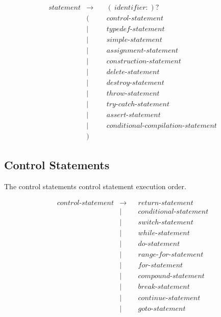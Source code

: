 \documentclass[a4paper,oneside,11pt]{article}
\begin{document}
\begin{align*}
statement &\rightarrow \> & &( \> \hyperref[identifier]{identifier} \texttt{:} \> )?\\
&( & &\hyperref[controlstatement]{control\textrm{-}statement}\\
&| & &\hyperref[typedefstatement]{typedef\textrm{-}statement}\\
&| & &\hyperref[simplestatement]{simple\textrm{-}statement}\\
&| & &\hyperref[assignmentstatement]{assignment\textrm{-}statement}\\
&| & &\hyperref[constructionstatement]{construction\textrm{-}statement}\\
&| & &\hyperref[deletestatement]{delete\textrm{-}statement}\\
&| & &\hyperref[destroystatement]{destroy\textrm{-}statement}\\
&| & &\hyperref[throwstatement]{throw\textrm{-}statement}\\
&| & &\hyperref[trystatement]{try\textrm{-}catch\textrm{-}statement}\\
&| & &\hyperref[assertstatement]{assert\textrm{-}statement}\\
&| & &\hyperref[conditionalcompilationstatement]{conditional\textrm{-}compilation\textrm{-}statement}\\
&)
\end{align*}

\subsection{Control Statements}\label{controlstatement}

The control statements control statement execution order.

\begin{align*}
control\textrm{-}statement &\rightarrow & &\hyperref[returnstatement]{return\textrm{-}statement}\\
&| & &\hyperref[conditionalstatement]{conditional\textrm{-}statement}\\
&| & &\hyperref[switchstatement]{switch\textrm{-}statement}\\
&| & &\hyperref[whilestatement]{while\textrm{-}statement}\\
&| & &\hyperref[dostatement]{do\textrm{-}statement}\\
&| & &\hyperref[rangeforstatement]{range\textrm{-}for\textrm{-}statement}\\
&| & &\hyperref[forstatement]{for\textrm{-}statement}\\
&| & &\hyperref[compoundstatement]{compound\textrm{-}statement}\\
&| & &\hyperref[breakstatement]{break\textrm{-}statement}\\
&| & &\hyperref[continuestatement]{continue\textrm{-}statement}\\
&| & &\hyperref[gotostatement]{goto\textrm{-}statement}
\end{align*}
\end{document}
